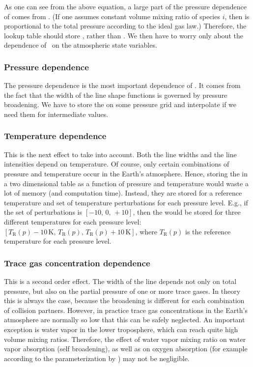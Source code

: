 As one can see from the above equation, a large part of the pressure
dependence of  comes from . (If one assumes
constant volume mixing ratio of species $i$, then  is
proportional to the total pressure according to the ideal gas law.) 
Therefore, the lookup table should store \AbsXsec, rather than
\AbsCoef. We then have to worry only about the dependence of \AbsXsec\
on the atmospheric state variables.

\subsubsection{Pressure dependence}

The pressure dependence is the most important dependence of
\AbsXsec. It comes from the fact that the width of the line shape
functions is governed by pressure broadening. We have to store the
\aAbsXsec{i} on some pressure grid and interpolate if we need them for
intermediate values.

\subsubsection{Temperature dependence}

This is the next effect to take into account. Both the line widths and
the line intensities depend on temperature. Of course, only certain
combinations of pressure and temperature occur in the Earth's
atmosphere. Hence, storing the  in a two dimensional table
as a function of pressure and temperature would waste a lot of memory (and
computation time).
Instead, they are stored for a reference temperature and set of
temperature perturbations for each pressure level. E.g., if the set of
perturbations is $[-10,\, 0,\, +10]$, then the \aAbsXsec{i} would be stored
for three different temperatures for each pressure level:
$[T_\mathrm{R}(p)-10\,\mbox{K},\, T_\mathrm{R}(p),\, T_\mathrm{R}(p)+10\,\mbox{K}]$, where
$T_\mathrm{R}(p)$ is the reference temperature for each pressure level.

\subsubsection{Trace gas concentration dependence}

This is a second order effect. The width of the line depends not only
on total pressure, but also on the partial pressure of one or more
trace gases. In theory this is always the case, because the broadening
is different for each combination of collision partners. However, in
practice trace gas concentrations in the Earth's atmosphere are
normally so low that this can be safely neglected. An important
exception is water vapor in the lower troposphere, which can reach
quite high volume mixing ratios. Therefore, the effect of water vapor
mixing ratio on water vapor absorption (self broadening), as well as
on oxygen absorption (for example according to the parameterization by
\citet{pwr:93}) may not be negligible.

